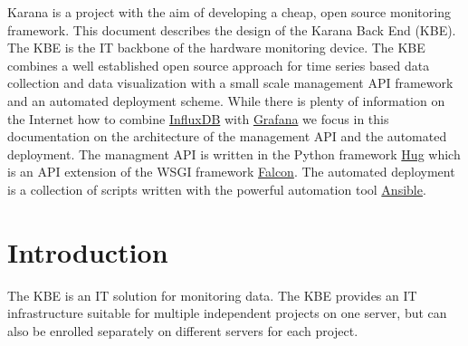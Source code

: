 \documentclass[draft=false,
10pt, %
a4paper, %
oneside, %
headinclude,footinclude, %
]{scrartcl}
\begin{document}
Karana is a project with the aim of developing a cheap, open source monitoring framework. This document describes the design of the Karana Back End (KBE). The KBE is the IT backbone of the hardware monitoring device. The KBE combines a well established open source approach for time series based data collection and data visualization with a small scale management API framework and an automated deployment scheme. While there is plenty of information on the Internet how to combine \href{https://www.influxdata.com/}{InfluxDB} with \href{http://grafana.org/}{Grafana} we focus in this documentation on the architecture of the management API and the automated deployment. The managment API is written in the Python framework \href{http://www.hug.rest/}{Hug} which is an API extension of the WSGI framework \href{http://falconframework.org/}{Falcon}. The automated deployment is a collection of scripts written with the powerful automation tool \href{https://www.ansible.com}{Ansible}. 

{\let\thefootnote\relax{}}



\newpage %


\section{Introduction}

The KBE is an IT solution for monitoring data. The KBE provides an IT infrastructure suitable for multiple independent projects on one server, but can also be enrolled separately on different servers for each project. 
\end{document}
